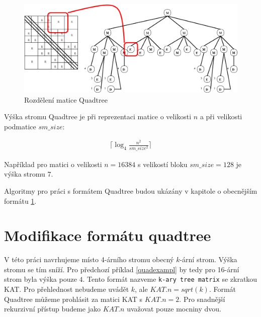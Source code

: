 \begin{figure}[htb]\centering
	\includegraphics[width=\textwidth]{./images/quadtree_sourceforge/quad2c.eps}
	\caption{Rozdělení matice Quadtree \cite{quadsime}}
	\label{fig:quad3}
\end{figure}


Výška stromu Quadtree je při reprezentaci matice o velikosti $n$ a při velikosti podmatice $sm\_size$:

\label{quadtreeheight}
\begin{align}
\Bigg\lceil\log_{4}\frac{n^2}{sm\_size^2}\Bigg\rceil
\end{align}

\label{quadexampl}
Například pro matici o velikosti $n=16384$ s velikostí bloku $sm\_size=128$ je výška stromu $7$.

Algoritmy pro práci s formátem Quadtree budou ukázány v kapitole o obecnějším formátu \ref{katchapter}.


\section{Modifikace formátu quadtree}
\label{katchapter}

V této práci navrhujeme místo 4-árního stromu obecný $k$-ární strom. Výška stromu se tím sníží. Pro předchozí příklad \ref{quadexampl} by tedy pro 16-ární strom byla výška pouze $4$. Tento formát nazveme \texttt{k-ary tree matrix} se zkratkou KAT. Pro přehlednost nebudeme uvádět $k$, ale $KAT.n = sqrt(k)$. Formát Quadtree můžeme prohlásit za matici KAT s $KAT.n = 2$. Pro snadnější rekurzivní přístup budeme jako $KAT.n$ uvažovat pouze mocniny dvou.

